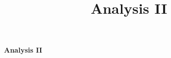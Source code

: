 \documentclass[a4paper,twocolumn,landscape]{scrartcl}
\title{Analysis II}
\begin{document}
\raggedright
\footnotesize

\begin{center}
     \Large{\textbf{Analysis II}} \\
\end{center}





\end{document}
